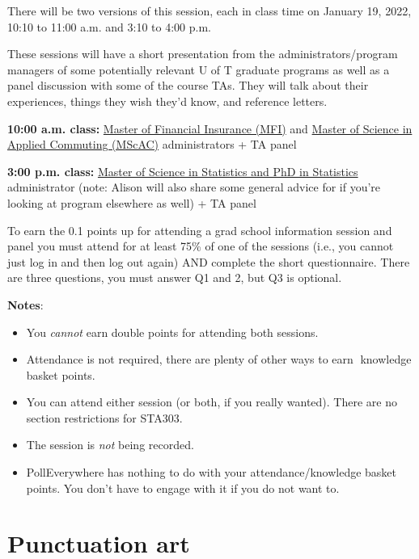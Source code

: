 \documentclass[
  openany]{book}
\providecommand{\tightlist}{%
  \setlength{\itemsep}{0pt}\setlength{\parskip}{0pt}}
\begin{document}
There will be two versions of this session, each in class time on January 19, 2022, 10:10 to 11:00 a.m. and 3:10 to 4:00 p.m.

These sessions will have a short presentation from the administrators/program managers of some potentially relevant U of T graduate programs as well as a panel discussion with some of the course TAs. They will talk about their experiences, things they wish they'd know, and reference letters.

\textbf{10:00 a.m. class:} \href{https://mfi.utoronto.ca/}{Master of Financial Insurance (MFI)} and \href{https://mscac.utoronto.ca/}{Master of Science in Applied Commuting (MScAC)} administrators + TA panel

\textbf{3:00 p.m. class:} \href{https://www.statistics.utoronto.ca/future-students/our-graduate-programs}{Master of Science in Statistics and PhD in Statistics} administrator (note: Alison will also share some general advice for if you're looking at program elsewhere as well) + TA panel

To earn the 0.1 points up for attending a grad school information session and panel you must attend for at least 75\% of one of the sessions (i.e., you cannot just log in and then log out again) AND complete the short questionnaire. There are three questions, you must answer Q1 and 2, but Q3 is optional.

\textbf{Notes}:

\begin{itemize}
\tightlist
\item
  You \emph{cannot} earn double points for attending both sessions.\\
\item
  Attendance is not required, there are plenty of other ways to earn 🧺knowledge basket points.\\
\item
  You can attend either session (or both, if you really wanted). There are no section restrictions for STA303.
\item
  The session is \emph{not} being recorded.
\item
  PollEverywhere has nothing to do with your attendance/knowledge basket points. You don't have to engage with it if you do not want to.
\end{itemize}

\hypertarget{punctuation-art}{%
\section{Punctuation art}\label{punctuation-art}}
\end{document}
